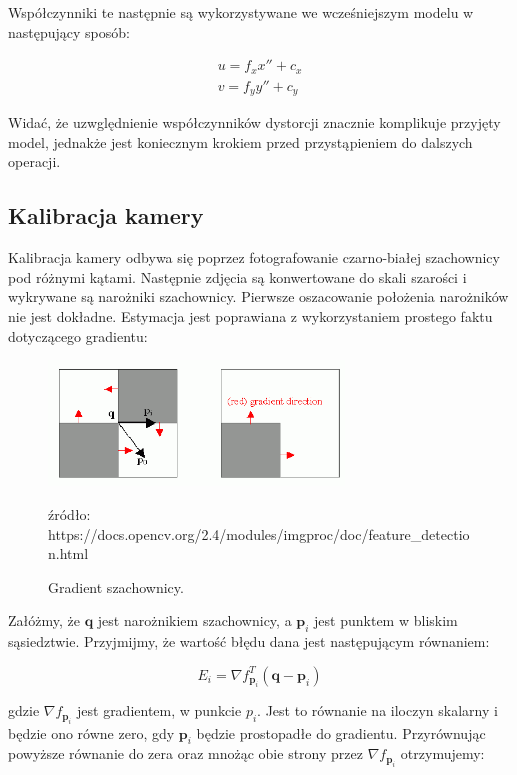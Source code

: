 \documentclass[oneside, eng]{mgr}
\newcommand{\bb}{\textbf}
\begin{document}
Współczynniki te następnie są wykorzystywane we wcześniejszym modelu w następujący sposób:

\begin{gather*}
	u = f_x x'' + c_x \\
	v = f_y y'' + c_y
\end{gather*}

Widać, że uzwględnienie współczynników dystorcji znacznie komplikuje przyjęty model, jednakże jest koniecznym krokiem przed przystąpieniem do dalszych operacji.

\subsection{Kalibracja kamery}

Kalibracja kamery odbywa się poprzez fotografowanie czarno-białej szachownicy pod różnymi kątami. Następnie zdjęcia są konwertowane do skali szarości i wykrywane są narożniki szachownicy. Pierwsze oszacowanie położenia narożników nie jest dokładne. Estymacja jest poprawiana z wykorzystaniem prostego faktu dotyczącego gradientu:

\begin{figure}
\centering
	\includegraphics[width=0.70\textwidth]{cornersubpix.png}\par\vspace{1cm}
\caption{Gradient szachownicy.}
źródło: https://docs.opencv.org/2.4/modules/imgproc/doc/feature\_detection.html
	\label{fig:gradient}
\end{figure}

Załóżmy, że $\bb{q}$ jest narożnikiem szachownicy, a $\bb{p}_i$ jest punktem w bliskim sąsiedztwie. Przyjmijmy, że wartość błędu dana jest następującym równaniem:

\begin{equation}
	E_i = \nabla f_{\bb{p}_i}^T (\bb{q} - \bb{p}_i)
\end{equation}

gdzie $\nabla f_{\bb{p}_i}$ jest gradientem, w punkcie $p_i$. Jest to równanie na iloczyn skalarny i będzie ono równe zero, gdy $\bb{p}_i$ będzie prostopadłe do gradientu. Przyrównując powyższe równanie do zera oraz mnożąc obie strony przez $\nabla f_{\bb{p}_i}$ otrzymujemy:
\end{document}
